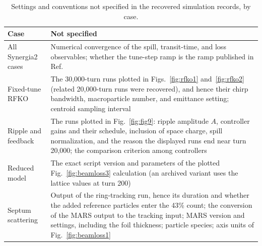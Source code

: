 \documentclass[a4paper,fleqn]{cas-sc}
\begin{document}
\begin{table}[width=\linewidth,cols=2,pos=!ht]
  \caption{\label{table:records}Settings and conventions not specified in the recovered simulation records, by case.}
  \small
  \renewcommand{\arraystretch}{1.2}
  \begin{tabular}{@{}>{\raggedright\arraybackslash}p{.2\linewidth}>{\raggedright\arraybackslash}p{.76\linewidth}@{}}
    \toprule
    Case & Not specified \\
    \midrule
    All Synergia2 cases & Numerical convergence of the spill, transit-time, and loss observables; whether the tune-step ramp is the ramp published in Ref.~\cite{mu2e} \\
    Fixed-tune RFKO & The 30,000-turn runs plotted in Figs.~\ref{fig:rfko1} and~\ref{fig:rfko2} (related 20,000-turn runs were recovered), and hence their chirp bandwidth, macroparticle number, and emittance setting; centroid sampling interval \\
    Ripple and feedback & The runs plotted in Fig.~\ref{fig:fig9}: ripple amplitude $A$, controller gains and their schedule, inclusion of space charge, spill normalization, and the reason the displayed runs end near turn 20,000; the comparison criterion among controllers \\
    Reduced model & The exact script version and parameters of the plotted Fig.~\ref{fig:beamloss3} calculation (an archived variant uses the lattice values at turn 200) \\
    Septum scattering & Output of the ring-tracking run, hence its duration and whether the added reference particles enter the 43\% count; the conversion of the MARS output to the tracking input; MARS version and settings, including the foil thickness; particle species; axis units of Fig.~\ref{fig:beamloss1} \\
    \bottomrule
  \end{tabular}
\end{table}
\end{document}
